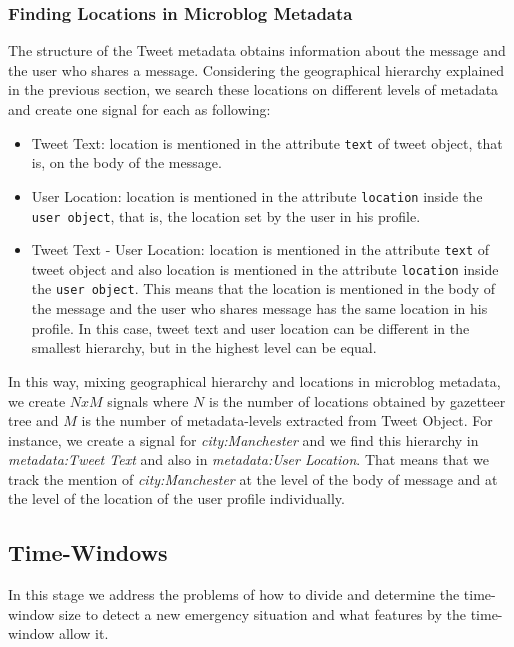 \documentclass[sigconf]{acmart}
\begin{document}
\subsubsection{Finding Locations in Microblog Metadata}

The structure of the Tweet metadata obtains information about the message and the user who shares a message. Considering the geographical hierarchy explained in the previous section, we search these locations on different levels of metadata and create one signal for each as following:

\begin{itemize}
	\item Tweet Text: location is mentioned in the attribute \texttt{text} of tweet object, that is, on the body of the message.
	\item User Location: location is mentioned in the attribute \texttt{location} inside the \texttt{user object}, that is, the location set by the user in his profile.
	\item Tweet Text - User Location: location is mentioned in the attribute \texttt{text} of tweet object and also location is mentioned in the attribute \texttt{location} inside the \texttt{user object}. This means that the location is mentioned in the body of the message and the user who shares message has the same location in his profile. In this case, tweet text and user location can be different in the smallest hierarchy, but in the highest level can be equal. 
\end{itemize}

In this way, mixing geographical hierarchy and locations in microblog metadata, we create $NxM$ signals where $N$ is the number of locations obtained by gazetteer tree and $M$ is the number of metadata-levels extracted from Tweet Object. For instance, we create a signal for \textit{city:Manchester} and we find this hierarchy in \textit{metadata:Tweet Text} and also in \textit{metadata:User Location}. That means that we track the mention of \textit{city:Manchester} at the level of the body of message and at the level of the location of the user profile individually.

\subsection{Time-Windows}
In this stage we address the problems of how to divide and determine the time-window size to detect a new emergency situation and what features by the time-window allow it.
\end{document}
